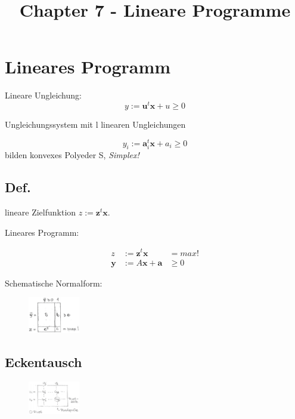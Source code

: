 \documentclass[8pt, DIV15, twocolumn]{scrartcl}
\title{Chapter 7 - Lineare Programme}
\date{}
\begin{document}
\setlength{\abovedisplayskip}{0pt}
\setlength{\belowdisplayskip}{0pt}
\setlength{\parskip}{0pt}
\setlength{\topmargin}{0pt}

 
\maketitle

\thispagestyle{empty}


\section*{Lineares Programm}
Lineare Ungleichung:
\begin{equation*}
y := \mathbf{u}^t \mathbf{x} + u \geq 0
\end{equation*} 

Ungleichungssystem mit l linearen Ungleichungen

\begin{equation*}
y_i := \mathbf{a}_i^t \mathbf{x} + a_i \geq 0
\end{equation*} 
bilden konvexes Polyeder S, \emph{Simplex!}

\subsection*{Def.}
lineare Zielfunktion $z := \mathbf{z}^t \mathbf{x}$.

Lineares Programm:

\begin{equation*}
\begin{aligned}
z &:= \mathbf{z}^t \mathbf{x} &= max! \\
\mathbf{y} &:= A \mathbf{x} + \mathbf{a} &\geq 0
\end{aligned}
\end{equation*} 

Schematische Normalform:

\begin{figure}[ht]
	\centering
  \includegraphics[width=0.2\textwidth]{schematischeNormalform.png}
\end{figure}

\subsection*{Eckentausch}
\begin{figure}[ht]
	\centering
  \includegraphics[width=0.2\textwidth]{eckentausch.png}
\end{figure}
\end{document}
